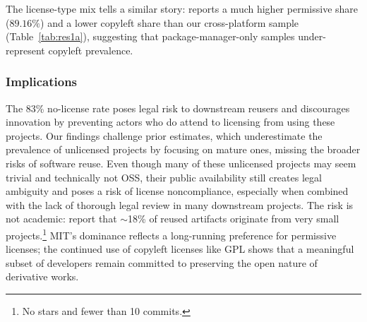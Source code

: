 The license-type mix tells a similar story: \citet{wu2024large}
reports a much higher permissive share ($89.16\%$) and a lower
copyleft share than our cross-platform sample
(Table~\ref{tab:res1a}), suggesting that package-manager-only samples
under-represent copyleft prevalence.

\begin{figure}[h]
  \vspace{-.1in}
  \centering
\setlength{\fboxsep}{4pt}

\end{figure}

\subsubsection{Implications}

The 83\% no-license rate poses legal risk to downstream reusers and
discourages innovation by preventing actors who do attend to licensing
from using these projects.
Our findings challenge prior estimates, which underestimate
the prevalence of unlicensed projects by focusing on mature ones,
missing the broader risks of software reuse. Even though many of
these unlicensed projects may seem trivial and technically not OSS,
their public availability still creates legal ambiguity and poses a
risk of license noncompliance, especially when combined with the lack
of thorough legal review in many downstream projects.
The risk is not academic: \citet{jahanshahi2025beyond} report that
$\sim$18\% of reused artifacts originate from very small
projects.\footnote{No stars and fewer than 10 commits.}
MIT's dominance reflects a long-running preference for permissive
licenses; the continued use of copyleft licenses like GPL shows that a
meaningful subset of developers remain committed to preserving the
open nature of derivative works.

